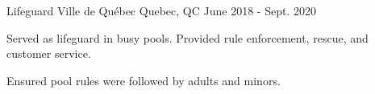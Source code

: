 \begin{cventries}
  \cventry
    {Lifeguard} %
    {Ville de Québec} %
    {Quebec, QC} %
    {June 2018 - Sept. 2020} %
    {
      \begin{cvitems} %
        \item {Served as lifeguard in busy pools. Provided rule enforcement, rescue, and customer service.}
        \item {Ensured pool rules were followed by adults and minors.}
      \end{cvitems}
    }
\end{cventries}
